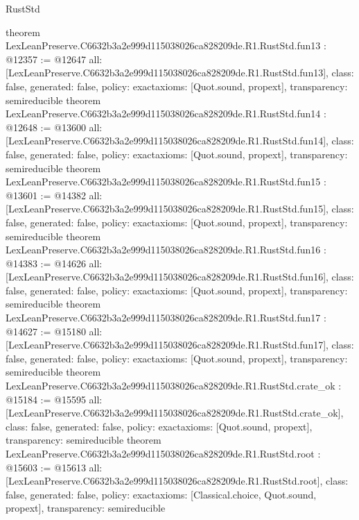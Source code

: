 \begin{lexlean}{RustStd}
\begin{coremodule}
{}
theorem LexLeanPreserve.C6632b3a2e999d115038026ca828209de.R1.RustStd.fun13 : @12357 := @12647 {
  all: [LexLeanPreserve.C6632b3a2e999d115038026ca828209de.R1.RustStd.fun13],
  class: false,
  generated: false,
  policy: exact{axioms: [Quot.sound, propext]},
  transparency: semireducible
}
theorem LexLeanPreserve.C6632b3a2e999d115038026ca828209de.R1.RustStd.fun14 : @12648 := @13600 {
  all: [LexLeanPreserve.C6632b3a2e999d115038026ca828209de.R1.RustStd.fun14],
  class: false,
  generated: false,
  policy: exact{axioms: [Quot.sound, propext]},
  transparency: semireducible
}
theorem LexLeanPreserve.C6632b3a2e999d115038026ca828209de.R1.RustStd.fun15 : @13601 := @14382 {
  all: [LexLeanPreserve.C6632b3a2e999d115038026ca828209de.R1.RustStd.fun15],
  class: false,
  generated: false,
  policy: exact{axioms: [Quot.sound, propext]},
  transparency: semireducible
}
theorem LexLeanPreserve.C6632b3a2e999d115038026ca828209de.R1.RustStd.fun16 : @14383 := @14626 {
  all: [LexLeanPreserve.C6632b3a2e999d115038026ca828209de.R1.RustStd.fun16],
  class: false,
  generated: false,
  policy: exact{axioms: [Quot.sound, propext]},
  transparency: semireducible
}
theorem LexLeanPreserve.C6632b3a2e999d115038026ca828209de.R1.RustStd.fun17 : @14627 := @15180 {
  all: [LexLeanPreserve.C6632b3a2e999d115038026ca828209de.R1.RustStd.fun17],
  class: false,
  generated: false,
  policy: exact{axioms: [Quot.sound, propext]},
  transparency: semireducible
}
theorem LexLeanPreserve.C6632b3a2e999d115038026ca828209de.R1.RustStd.crate_ok : @15184 := @15595 {
  all: [LexLeanPreserve.C6632b3a2e999d115038026ca828209de.R1.RustStd.crate_ok],
  class: false,
  generated: false,
  policy: exact{axioms: [Quot.sound, propext]},
  transparency: semireducible
}
theorem LexLeanPreserve.C6632b3a2e999d115038026ca828209de.R1.RustStd.root : @15603 := @15613 {
  all: [LexLeanPreserve.C6632b3a2e999d115038026ca828209de.R1.RustStd.root],
  class: false,
  generated: false,
  policy: exact{axioms: [Classical.choice, Quot.sound, propext]},
  transparency: semireducible
}


\end{coremodule}
\end{lexlean}

